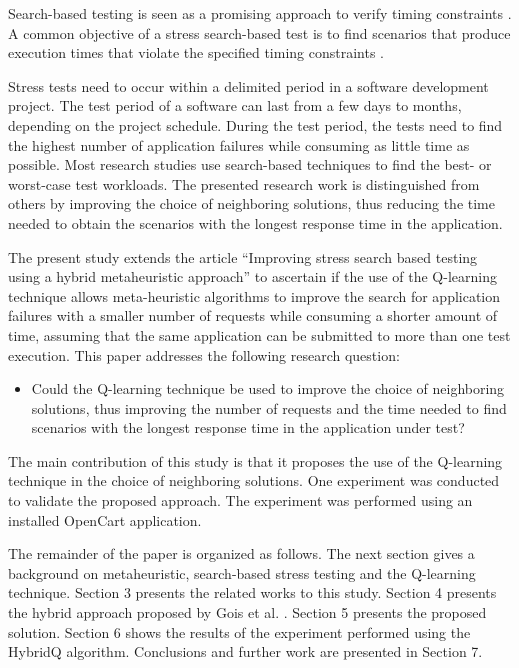 \documentclass{bmcart}
\begin{document}
Search-based testing is seen as a promising approach to verify timing constraints \citep{Afzal2009a}. A common objective of a stress search-based test is to find scenarios that produce execution times that violate the specified timing constraints \citep{Sullivan}. 


Stress tests need to occur within a delimited period in a software development project. The test period of a software can last from a few days to months, depending on the project schedule. During the test period, the tests need to find the highest number of application failures while consuming as little time as possible. Most research studies use search-based techniques to find the best- or worst-case test workloads. The presented research work is distinguished from others by improving the choice of neighboring solutions, thus reducing the time needed to obtain the scenarios with the longest response time in the application. 

The present study extends the article ``Improving stress search based testing using a hybrid metaheuristic approach''  \citep{Gois2016} to ascertain if the use of the Q-learning technique allows meta-heuristic algorithms to improve the search for application failures with a smaller number of requests while consuming a shorter amount of time, assuming that the same application can be submitted to more than one test execution. This paper addresses the following research question:

\begin{itemize}
\item Could the Q-learning technique be used to improve the choice of neighboring solutions, thus improving the number of requests and the time needed to find scenarios with the longest response time in the application under test?
\end{itemize}

The main contribution of this study is that it proposes the use of the Q-learning technique in the choice of neighboring solutions. One experiment was conducted to validate the proposed approach. The experiment was performed using an installed OpenCart application.

The remainder of the paper is organized as follows. The next section gives a background on metaheuristic, search-based stress testing and the Q-learning technique. Section 3 presents the related works to this study. Section 4 presents the hybrid approach proposed by Gois et al. \citep{Gois2016}. Section 5 presents the proposed solution. Section 6 shows the results of the experiment performed using the HybridQ algorithm.  Conclusions and further work are presented in Section 7.
\end{document}
